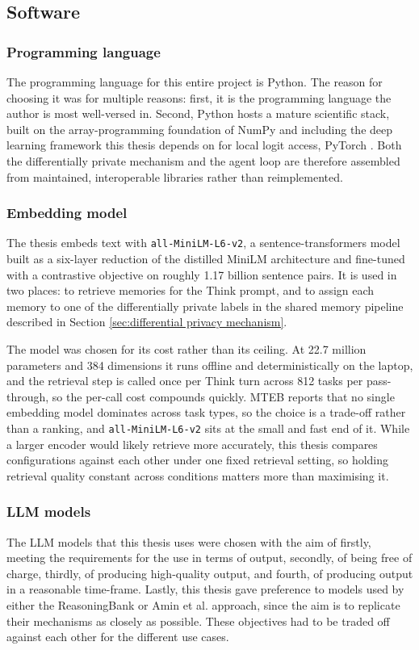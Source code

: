 \subsection{Software}

\subsubsection{Programming language}
The programming language for this entire project is Python. The reason for choosing it was for multiple reasons: first, it is the programming language the author is most well-versed in. Second, Python hosts a mature scientific stack, built on the array-programming foundation of NumPy \citep{harris2020array} and including the deep learning framework this thesis depends on for local logit access, PyTorch \citep{paszke2019pytorch}. Both the differentially private mechanism and the agent loop are therefore assembled from maintained, interoperable libraries rather than reimplemented.

\subsubsection{Embedding model}
The thesis embeds text with \texttt{all-MiniLM-L6-v2}, a sentence-transformers model \citep{reimers2019sentencebert} built as a six-layer reduction of the distilled MiniLM architecture \citep{wang2020minilm} and fine-tuned with a contrastive objective on roughly 1.17 billion sentence pairs. It is used in two places: to retrieve memories for the Think prompt, and to assign each memory to one of the differentially private labels in the shared memory pipeline described in Section \ref{sec:differential privacy mechanism}.

The model was chosen for its cost rather than its ceiling. At 22.7 million parameters and 384 dimensions it runs offline and deterministically on the laptop, and the retrieval step is called once per Think turn across 812 tasks per pass-through, so the per-call cost compounds quickly. MTEB \citep{muennighoff2023mteb} reports that no single embedding model dominates across task types, so the choice is a trade-off rather than a ranking, and \texttt{all-MiniLM-L6-v2} sits at the small and fast end of it. While a larger encoder would likely retrieve more accurately, this thesis compares configurations against each other under one fixed retrieval setting, so holding retrieval quality constant across conditions matters more than maximising it.

\subsubsection{LLM models}
The LLM models that this thesis uses were chosen with the aim of firstly, meeting the requirements for the use in terms of output, secondly, of being free of charge, thirdly, of producing high-quality output, and fourth, of producing output in a reasonable time-frame. Lastly, this thesis gave preference to models used by either the ReasoningBank or Amin et al. approach, since the aim is to replicate their mechanisms as closely as possible. These objectives had to be traded off against each other for the different use cases.

